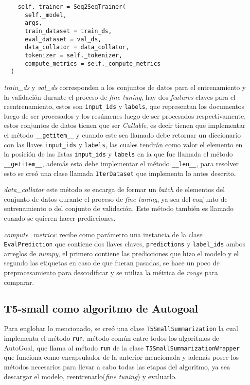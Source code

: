 \begin{verbatim}
    self._trainer = Seq2SeqTrainer(
      self._model,
      args,
      train_dataset = train_ds,
      eval_dataset = val_ds,
      data_collator = data_collator,
      tokenizer = self._tokenizer,
      compute_metrics = self._compute_metrics
  )
\end{verbatim}

\textit{train\_ds} y \textit{val\_ds} corresponden a los conjuntos de datos para el entrenamiento y la validación durante el proceso de \textit{fine tuning}, hay dos \textit{features} claves para el reentrenamiento, estos son \texttt{input\_ids} y \texttt{labels}, que representan los documentos luego de ser procesados  y los resúmenes luego de ser procesados respectivamente, estos conjuntos de datos tienen que ser \textit{Callable}, es decir tienen que implementar el método \texttt{\_\_getitem\_\_} y cuando este sea llamado debe retornar un diccionario con las llaves \texttt{input\_ids} y \texttt{labels}, las cuales tendrán como valor el elemento en la posición de las listas \texttt{input\_ids} y \texttt{labels} en la que fue llamada el método \texttt{\_\_getitem\_\_}, además esta debe implementar el método \texttt{\_\_len\_\_}, para resolver esto se creó una clase llamada \texttt{IterDataset} que implementa lo antes descrito.

\textit{data\_collator} este método se encarga de formar un \textit{batch} de elementos del conjunto de datos durante el proceso de \textit{fine tuning}, ya sea del conjunto de entrenamiento o del conjunto de validación. Este método también es llamado cuando se quieren hacer predicciones.

\textit{compute\_metrics}: recibe como parámetro una instancia de la clase \texttt{EvalPrediction} que contiene dos llaves claves, \texttt{predictions} y \texttt{label\_ids} ambos arreglos de \textit{numpy}, el primero contiene las predicciones que hizo el modelo y el segundo las etiquetas en caso de que fueran pasadas, se hace un poco de preprocesamiento para descodificar y se utiliza la métrica de \textit{rouge} para comparar.

\subsection{T5-small como algoritmo de Autogoal}
Para englobar lo mencionado, se creó una clase \texttt{T5SmallSummarization} la cual implementa el método \texttt{run}, método común entre todos los algoritmos de AutoGoal, que llama al método \texttt{run} de la clase \texttt{T5SmallSummarizationWrapper} que funciona como encapsulador de la anterior mencionada y además posee los métodos necesarios para llevar a cabo todas las etapas del algoritmo, ya sea descargar el modelo, reentrenarlo(\textit{fine tuning}) y evaluarlo.

